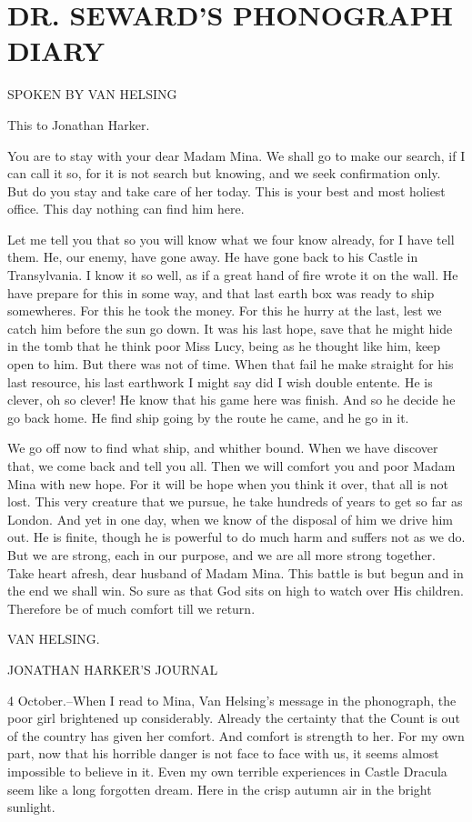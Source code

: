 \chapter{DR. SEWARD'S PHONOGRAPH DIARY}

SPOKEN BY VAN HELSING 

This to Jonathan Harker. 

You are to stay with your dear Madam Mina. We shall go to make our search, if I can call it so, for it is not search but knowing, and we seek confirmation only. But do you stay and take care of her today. This is your best and most holiest office. This day nothing can find him here. 

Let me tell you that so you will know what we four know already, for I have tell them. He, our enemy, have gone away. He have gone back to his Castle in Transylvania. I know it so well, as if a great hand of fire wrote it on the wall. He have prepare for this in some way, and that last earth box was ready to ship somewheres. For this he took the money. For this he hurry at the last, lest we catch him before the sun go down. It was his last hope, save that he might hide in the tomb that he think poor Miss Lucy, being as he thought like him, keep open to him. But there was not of time. When that fail he make straight for his last resource, his last earthwork I might say did I wish double entente. He is clever, oh so clever! He know that his game here was finish. And so he decide he go back home. He find ship going by the route he came, and he go in it. 

We go off now to find what ship, and whither bound. When we have discover that, we come back and tell you all. Then we will comfort you and poor Madam Mina with new hope. For it will be hope when you think it over, that all is not lost. This very creature that we pursue, he take hundreds of years to get so far as London. And yet in one day, when we know of the disposal of him we drive him out. He is finite, though he is powerful to do much harm and suffers not as we do. But we are strong, each in our purpose, and we are all more strong together. Take heart afresh, dear husband of Madam Mina. This battle is but begun and in the end we shall win. So sure as that God sits on high to watch over His children. Therefore be of much comfort till we return. 

VAN HELSING. 

JONATHAN HARKER'S JOURNAL 

4 October.--When I read to Mina, Van Helsing's message in the phonograph, the poor girl brightened up considerably. Already the certainty that the Count is out of the country has given her comfort. And comfort is strength to her. For my own part, now that his horrible danger is not face to face with us, it seems almost impossible to believe in it. Even my own terrible experiences in Castle Dracula seem like a long forgotten dream. Here in the crisp autumn air in the bright sunlight. 

